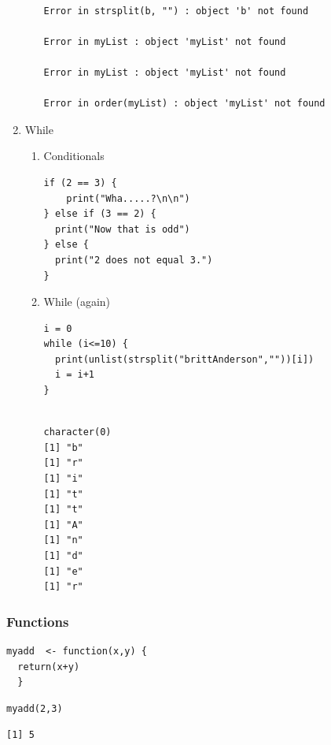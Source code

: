 \documentclass{article}
\begin{document}
\begin{enumerate}
\begin{enumerate}
\begin{verbatim}

Error in strsplit(b, "") : object 'b' not found

Error in myList : object 'myList' not found

Error in myList : object 'myList' not found

Error in order(myList) : object 'myList' not found
\end{verbatim}
\end{enumerate}

\item While
\label{sec:org639af0f}
\begin{enumerate}
\item Conditionals
\label{sec:org354601c}
\begin{verbatim}
if (2 == 3) {
    print("Wha.....?\n\n")
} else if (3 == 2) {
  print("Now that is odd")
} else {
  print("2 does not equal 3.")
}
\end{verbatim}
\item While (again)
\label{sec:orgb3cd407}
\begin{verbatim}
i = 0
while (i<=10) {
  print(unlist(strsplit("brittAnderson",""))[i])
  i = i+1
}
\end{verbatim}

\begin{verbatim}

character(0)
[1] "b"
[1] "r"
[1] "i"
[1] "t"
[1] "t"
[1] "A"
[1] "n"
[1] "d"
[1] "e"
[1] "r"
\end{verbatim}
\end{enumerate}
\end{enumerate}


\subsubsection{Functions}
\label{sec:org415a96e}
\begin{verbatim}
myadd  <- function(x,y) {
  return(x+y)
  }
\end{verbatim}

\begin{verbatim}
myadd(2,3)
\end{verbatim}

\begin{verbatim}
[1] 5
\end{verbatim}
\end{document}
